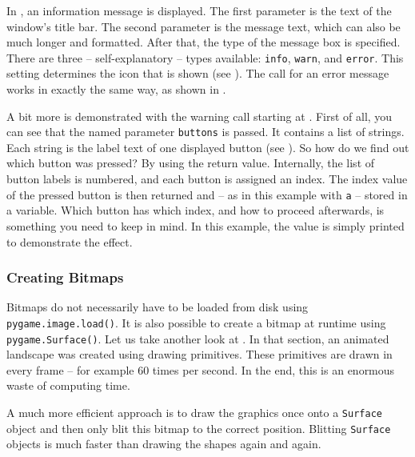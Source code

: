 In , an information message is displayed. The first parameter is the text of the window’s title bar. The second parameter is the message text, which can also be much longer and formatted. After that, the type of the message box is specified. There are three -- self-explanatory -- types available: \texttt{info}, \texttt{warn}, and \texttt{error}. This setting determines the icon that is shown (see ). The call for an error message works in exactly the same way, as shown in .

A bit more is demonstrated with the warning call starting at . First of all, you can see that the named parameter \texttt{buttons}  is passed. It contains a list of strings. Each string is the label text of one displayed button (see ). So how do we find out which button was pressed? By using the return value. Internally, the list of button labels is numbered, and each button is assigned an index. The index value of the pressed button is then returned and -- as in this example with \texttt{a} -- stored in a variable. Which button has which index, and how to proceed afterwards, is something you need to keep in mind. In this example, the value is simply printed to demonstrate the effect.


\subsubsection{Creating Bitmaps}\label{secCreateBitmaps}
Bitmaps do not necessarily have to be loaded from disk using \texttt{pygame.image.load()}. It is also possible to create a bitmap at runtime using \texttt{pygame.Surface()}. Let us take another look at . In that section, an animated landscape was created using drawing primitives. These primitives are drawn in every frame -- for example 60 times per second. In the end, this is an enormous waste of computing time.

\begin{hintbox}
	A much more efficient approach is to draw the graphics once onto a \texttt{Surface} object and then only blit this bitmap to the correct position. Blitting \texttt{Surface} objects is much faster than drawing the shapes again and again.
\end{hintbox}


